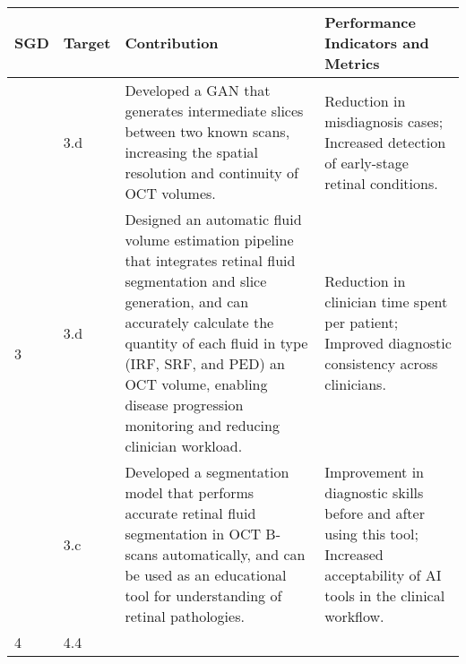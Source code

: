 \begin{center}
	\begin{tabular}{|l|l|p{58mm}|p{52mm}|}
		\hline
		\textbf{SGD} & \textbf{Target} & \textbf{Contribution} & \textbf{Performance Indicators and Metrics} \\ 
		\hline
		\hline
		\multirow{3}{*}{3} 
		& 3.d & Developed a GAN that generates intermediate slices between two known scans, increasing the spatial resolution and continuity of OCT volumes. & Reduction in misdiagnosis cases; Increased detection of early-stage retinal conditions.\\
		\cline{2-4}
		& 3.d & Designed an automatic fluid volume estimation pipeline that integrates retinal fluid segmentation and slice generation, and can accurately calculate the quantity of each fluid in type (IRF, SRF, and PED) an OCT volume, enabling disease progression monitoring and reducing clinician workload. & Reduction in clinician time spent per patient; Improved diagnostic consistency across clinicians.\\
		\cline{2-4}
		& 3.c & \parbox[t]{58mm}{Developed a segmentation model that performs accurate retinal fluid segmentation in OCT B-scans automatically, and can be used as an educational tool for understanding of retinal pathologies.} & \parbox[t]{52mm}{Improvement in diagnostic skills before and after using this tool; Increased acceptability of AI tools in the clinical workflow.}\\
		4 & 4.4 & & \\
		\hline
	\end{tabular}
\end{center}